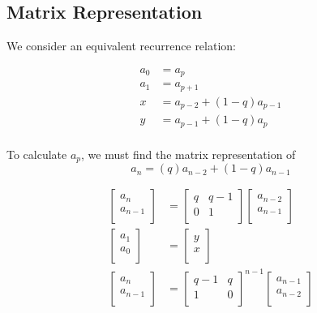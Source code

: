 \documentclass[paper.tex]{subfiles}
\begin{document}
\subsection{Matrix Representation}

We consider an equivalent recurrence relation:

\begin{align*}
	a_{0} &= a_{p} \\
	a_{1} &= a_{p+1} \\
	x &= a_{p-2} + (1-q)a_{p-1} \\
	y &= a_{p-1} + (1-q)a_{p} \\
\end{align*}

To calculate $a_{p}$, we must find the matrix representation of
$$ a_{n} = (q)a_{n-2} + (1-q)a_{n-1} $$

\begin{align*}
\left[ \begin{array}{ccc}
a_{n} \\
a_{n-1} \\
\end{array} \right]
&=
\left[ \begin{array}{ccc}
q & q-1 \\
0 & 1 \\
\end{array} \right]
\left[ \begin{array}{ccc}
 a_{n-2}\\
a_{n-1} \\
\end{array} \right] \\
\left[ \begin{array}{ccc}
a_{1} \\
a_{0} \\
\end{array} \right]
&=
\left[ \begin{array}{ccc}
y \\
x \\
\end{array} \right] \\
\left[ \begin{array}{ccc}
a_{n} \\
a_{n-1} \\
\end{array} \right]
&=
\left[ \begin{array}{ccc}
q-1 & q \\
1 & 0 \\
\end{array} \right] ^{n-1}
\left[ \begin{array}{ccc}
 a_{n-1}\\
a_{n-2} \\
\end{array} \right]
\end{align*}
\end{document}
